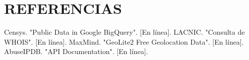 \section{REFERENCIAS}

\begin{thebibliography}{9}
     Censys. "Public Data in Google BigQuery". [En línea].
     LACNIC. "Consulta de WHOIS". [En línea].
     MaxMind. "GeoLite2 Free Geolocation Data". [En línea].
     AbuseIPDB. "API Documentation". [En línea].
\end{thebibliography}
